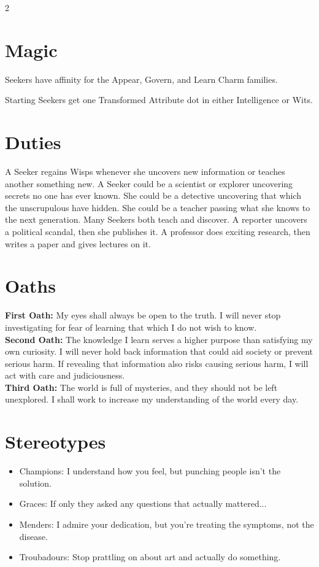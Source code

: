 \begin{multicols}{2}
\section*{Magic}

Seekers have affinity for the Appear, Govern, and Learn Charm families.

Starting Seekers get one Transformed Attribute dot in either Intelligence or Wits. 

\section*{Duties}

A Seeker regains Wisps whenever she uncovers new information or teaches another something new. A Seeker could be a scientist or explorer uncovering secrets no one has ever known. She could be a detective uncovering that which the unscrupulous have hidden. She could be a teacher passing what she knows to the next generation. Many Seekers both teach and discover. A reporter uncovers a political scandal, then she publishes it. A professor does exciting research, then writes a paper and gives lectures on it. 

\section*{Oaths}
\noindent \textbf{First Oath:} My eyes shall always be open to the truth. I will never stop investigating for fear of learning that which I do not wish to know. \\
\noindent \textbf{Second Oath:} The knowledge I learn serves a higher purpose than satisfying my own curiosity. I will never hold back information that could aid society or prevent serious harm. If revealing that information also risks causing serious harm, I will act with care and judiciousness. \\
\noindent \textbf{Third Oath:} The world is full of mysteries, and they should not be left unexplored. I shall work to increase my understanding of the world every day.


\section*{Stereotypes}
\begin{itemize}

\item Champions: I understand how you feel, but punching people isn't the solution.
\item Graces: If only they asked any questions that actually mattered... 
\item Menders: I admire your dedication, but you're treating the symptoms, not the disease.
\item Troubadours: Stop prattling on about art and actually do something.


\end{itemize}
\end{multicols}
